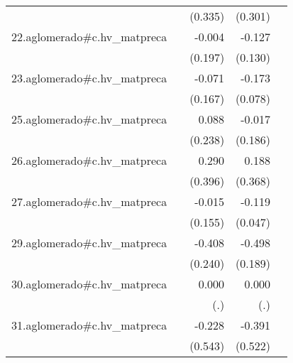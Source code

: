 {\begin{longtable}{l*{4}{D{.}{.}{-1}}}
            &                     &     (0.335)         &     (0.301)         &                     \\
\addlinespace
22.aglomerado#c.hv\_matpreca&                     &      -0.004         &      -0.127         &                     \\
            &                     &     (0.197)         &     (0.130)         &                     \\
\addlinespace
23.aglomerado#c.hv\_matpreca&                     &      -0.071         &      -0.173\sym{*}  &                     \\
            &                     &     (0.167)         &     (0.078)         &                     \\
\addlinespace
25.aglomerado#c.hv\_matpreca&                     &       0.088         &      -0.017         &                     \\
            &                     &     (0.238)         &     (0.186)         &                     \\
\addlinespace
26.aglomerado#c.hv\_matpreca&                     &       0.290         &       0.188         &                     \\
            &                     &     (0.396)         &     (0.368)         &                     \\
\addlinespace
27.aglomerado#c.hv\_matpreca&                     &      -0.015         &      -0.119\sym{*}  &                     \\
            &                     &     (0.155)         &     (0.047)         &                     \\
\addlinespace
29.aglomerado#c.hv\_matpreca&                     &      -0.408         &      -0.498\sym{**} &                     \\
            &                     &     (0.240)         &     (0.189)         &                     \\
\addlinespace
30.aglomerado#c.hv\_matpreca&                     &       0.000         &       0.000         &                     \\
            &                     &         (.)         &         (.)         &                     \\
\addlinespace
31.aglomerado#c.hv\_matpreca&                     &      -0.228         &      -0.391         &                     \\
            &                     &     (0.543)         &     (0.522)         &                     \\

\end{longtable}}
